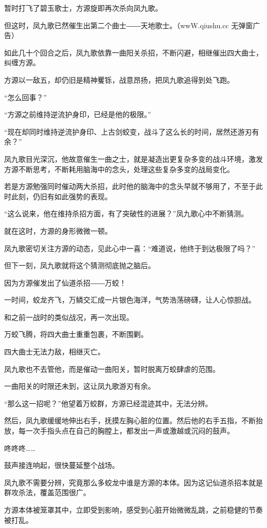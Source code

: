 \begin{this_body}
暂时打飞了碧玉歌士，方源旋即再次杀向凤九歌。

但这时，凤九歌已然催生出第二个曲士――天地歌士。（wwW.qiushu.cc 无弹窗广告）

如此几十个回合之后，凤九歌依靠一曲阳关杀招，不断闪避，相继催出四大曲士，纠缠方源。

方源以一敌五，却仍旧是精神矍铄，战意昂扬，把凤九歌追得到处飞跑。

“怎么回事？”

“方源之前维持逆流护身印，已经是他的极限。”

“现在却同时维持逆流护身印、上古剑蛟变，战斗了这么长的时间，居然还游刃有余？”

凤九歌目光深沉，他故意催生一曲之士，就是凝造出更复杂多变的战斗环境，激发方源不断思考，不断耗用脑海中的念头，处理这些复杂多变的战局变化。

若是方源勉强同时催动两大杀招，此时他的脑海中的念头早就不够用了，不至于此时此刻，仍旧有如此强势的表现。

“这么说来，他在维持杀招方面，有了突破性的进展？”凤九歌心中不断猜测。

就在这时，方源的身形微微一顿。

凤九歌密切关注方源的动态，见此心中一喜：“难道说，他终于到达极限了吗？”

但下一刻，凤九歌就将这个猜测彻底抛之脑后。

因为方源催发出了仙道杀招――万蛟！

一时间，蛟龙齐飞，万鳞交汇成一片银色海洋，气势浩荡磅礴，让人心惊胆战。

和之前一战时的类似战况，再一次出现。

万蛟飞腾，将四大曲士重重包裹，不断围剿。

四大曲士无法力敌，相继灭亡。

凤九歌也不去管他，而是催动一曲阳关，暂时脱离万蛟肆虐的范围。

一曲阳关的时限还未到，这让凤九歌游刃有余。

“那么这一招呢？”他望着万蛟群，方源已经混迹其中，无法分辨。

然后，凤九歌缓缓地伸出右手，抚摸左胸心脏的位置。然后他的右手五指，不断抬放，每一次手指头点在自己的胸膛上，都发出一声或激越或沉闷的鼓声。

咚咚咚……

鼓声接连响起，很快蔓延整个战场。

凤九歌不需要分辨，究竟那么多蛟龙中谁是方源的本体。因为这记仙道杀招本就是群攻杀法，覆盖范围很广。

方源本体被笼罩其中，立即受到影响，感受到心脏开始微微乱跳，之前稳健的节奏被打乱。


\end{this_body}
